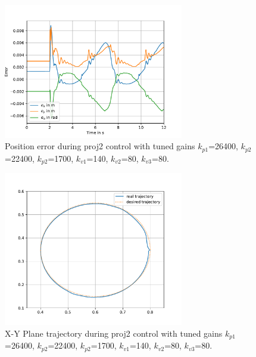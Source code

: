 \begin{figure} [H]
   \begin{center}
        \includegraphics[width=0.7\textwidth]{SRC/CircleTraj_exeyea.pdf}
   \end{center}
  \caption{Position error during proj2 control with tuned gains $k_{p1}$=26400, $k_{p2}$=22400, $k_{p2}$=1700, $k_{v1}$=140, $k_{v2}$=80, $k_{v3}$=80.}
  \label{fig:CircTunederror}
\end{figure}


\begin{figure} [H]
   \begin{center}
        \includegraphics[width=0.7\textwidth]{SRC/CircleTraj_X_Y.pdf}
   \end{center}
  \caption{X-Y Plane trajectory during proj2 control with tuned gains $k_{p1}$=26400, $k_{p2}$=22400, $k_{p2}$=1700, $k_{v1}$=140, $k_{v2}$=80, $k_{v3}$=80.}
  \label{fig:CircTunedXYPLANE}
\end{figure}

